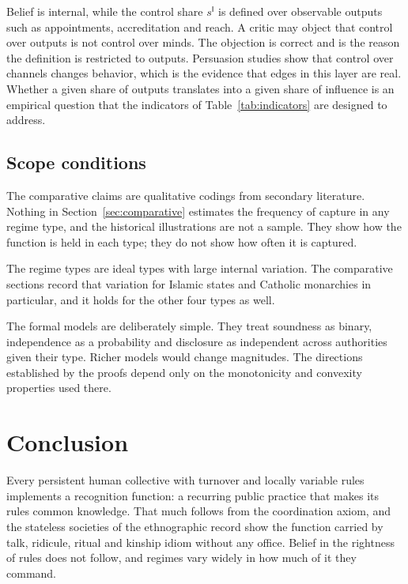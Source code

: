 \documentclass[11pt,letterpaper]{article}
\theoremstyle{definition}
\theoremstyle{remark}
\newcommand{\pI}{\mathsf{I}}
\begin{document}
Belief is internal, while the control share $s^{\pI}$ is defined over observable outputs such as appointments, accreditation and reach. A critic may object that control over outputs is not control over minds. The objection is correct and is the reason the definition is restricted to outputs. Persuasion studies \citep{dellavigna2007,enikolopov2011} show that control over channels changes behavior, which is the evidence that edges in this layer are real. Whether a given share of outputs translates into a given share of influence is an empirical question that the indicators of Table~\ref{tab:indicators} are designed to address.

\subsection{Scope conditions}

The comparative claims are qualitative codings from secondary literature. Nothing in Section~\ref{sec:comparative} estimates the frequency of capture in any regime type, and the historical illustrations are not a sample. They show how the function is held in each type; they do not show how often it is captured.

The regime types are ideal types with large internal variation. The comparative sections record that variation for Islamic states and Catholic monarchies in particular, and it holds for the other four types as well.

The formal models are deliberately simple. They treat soundness as binary, independence as a probability and disclosure as independent across authorities given their type. Richer models would change magnitudes. The directions established by the proofs depend only on the monotonicity and convexity properties used there.

\section{Conclusion}
\label{sec:conclusion}

Every persistent human collective with turnover and locally variable rules implements a recognition function: a recurring public practice that makes its rules common knowledge. That much follows from the coordination axiom, and the stateless societies of the ethnographic record show the function carried by talk, ridicule, ritual and kinship idiom without any office. Belief in the rightness of rules does not follow, and regimes vary widely in how much of it they command.
\end{document}
